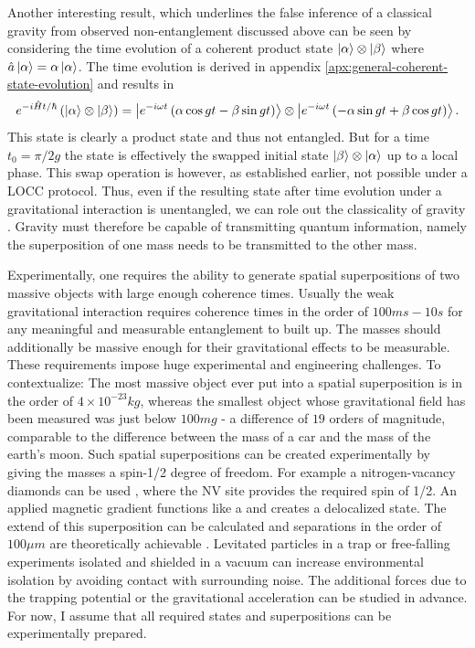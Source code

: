 Another interesting result, which underlines the false inference of a classical gravity from observed non-entanglement discussed above can be seen by considering the time evolution of a coherent product state $\ket{\alpha} \otimes \ket{\beta}$ where $\hat{a}\ket{\alpha} = \alpha\ket{\alpha}$. The time evolution is derived in appendix \ref{apx:general-coherent-state-evolution} and results in
\begin{equation}
  e^{-i\hat{H}t/\hbar} \left( \ket{\alpha} \otimes \ket{\beta} \right) = \ket{ e^{-i\omega t} \left( \alpha \cos gt - \beta \sin gt \right) }\otimes\ket{ e^{-i\omega t} \left( - \alpha \sin gt + \beta \cos gt \right) } .
\end{equation}
This state is clearly a product state and thus not entangled. But for a time $t_0 = \pi/2g$ the state is effectively the swapped initial state $\ket{\beta} \otimes \ket{\alpha}$ up to a local phase. This swap operation is however, as established earlier, not possible under a LOCC protocol. Thus, even if the resulting state after time evolution under a gravitational interaction is unentangled, we can role out the classicality of gravity \cite{Carney_2018,Lami_2024}. 
Gravity must therefore be capable of transmitting quantum information, namely the superposition of one mass needs to be transmitted to the other mass.

Experimentally, one requires the ability to generate spatial superpositions of two massive objects with large enough coherence times. Usually the weak gravitational interaction requires coherence times in the order of $100\si{ms} - 10\si{s}$ for any meaningful and measurable entanglement to built up. The masses should additionally be massive enough for their gravitational effects to be measurable.
These requirements impose huge experimental and engineering challenges. To contextualize: The most massive object ever put into a spatial superposition is in the order of $4 \times 10^{-23}\si{kg}$, whereas the smallest object whose gravitational field has been measured was just below $100 \si{mg}$ \cite{Westphal_2021} - a difference of $19$ orders of magnitude, comparable to the difference between the mass of a car and the mass of the earth's moon.
Such spatial superpositions can be created experimentally by giving the masses a spin-1/2 degree of freedom. For example a nitrogen-vacancy diamonds can be used \cite{Bose_2017}, where the NV site provides the required spin of 1/2. An applied magnetic gradient functions like a  and creates a delocalized state.
The extend of this superposition can be calculated and separations in the order of $100 \si{\mu m}$ are theoretically achievable \cite{Bose_2017}.
Levitated particles in a trap or free-falling experiments isolated and shielded in a vacuum can increase environmental isolation by avoiding contact with surrounding noise. The additional forces due to the trapping potential or the gravitational acceleration can be studied in advance. 
For now, I assume that all required states and superpositions can be experimentally prepared.

